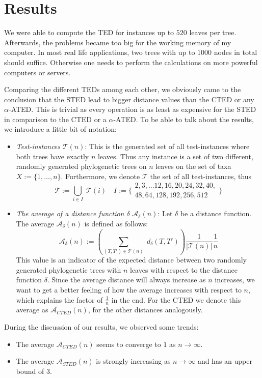 \section{Results}
We were able to compute the TED for instances up to $520$ leaves per tree. Afterwards, the problems became too big for the working memory of my computer. In most real life applications, two trees with up to $1000$ nodes in total should suffice. Otherwise one needs to perform the calculations on more powerful computers or servers. 

Comparing the different TEDs among each other, we obviously came to the conclusion that the STED lead to bigger distance values than the CTED or any $\alpha$-ATED. This is trivial as every operation is as least as expensive for the STED in comparison to the CTED or a $\alpha$-ATED. To be able to talk about the results, we introduce a little bit of notation:
\begin{itemize}
	\item \textit{Test-instances} $\mathcal{T}(n)$: This is the generated set of all test-instances where both trees have exactly $n$ leaves. Thus any instance is a set of two different, randomly generated phylogenetic trees on $n$ leaves on the set of taxa $X:= \{1,...,n\}$. Furthermore, we denote $\mathcal{T}$ the set of all test-instances, thus 
	$$\mathcal{T} := \bigcup_{i \in I} \; \mathcal{T}(i) \quad I:= \{\substack{2,3,...12,16,20,24,32,40,\\48,64,128,192,256,512}\}$$
	\item \textit{The average of a distance function $\delta$} $\mathcal{A}_{\delta}(n)$: Let $\delta$ be a distance function. The average $\mathcal{A}_{\delta}(n)$ is defined as follows:
	$$ \mathcal{A}_{\delta}(n) := (\sum_{(T,T') \in \mathcal{T}(n)} \; d_{\delta}(T,T'))\frac{1}{|\mathcal{T}(n)|}\frac{1}{n} $$
	This value is an indicator of the expected distance between two randomly generated phylogenetic trees with $n$ leaves with respect to the distance function $\delta$. Since the average distance will always increase as $n$ increases, we want to get a better feeling of how the average increases with respect to $n$, which explains the factor of $\frac{1}{n}$ in the end. For the CTED we denote this average as $\mathcal{A}_{CTED}(n)$, for the other distances analogously. 
\end{itemize}
During the discussion of our results, we observed some trends:
\begin{itemize}
\item The average $\mathcal{A}_{CTED}(n)$ seems to converge to $1$ as $n \to \infty$.
\item The average $\mathcal{A}_{STED}(n)$ is strongly increasing as $n \to \infty$ and has an upper bound of $3$.
\end{itemize}
